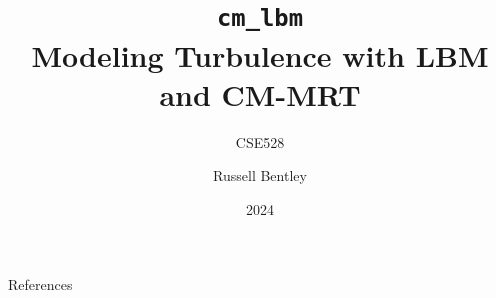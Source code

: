\documentclass{beamer}
\title{\lstinline{cm_lbm} \\ Modeling Turbulence with LBM and CM-MRT}
\subtitle{CSE528}
\author{Russell Bentley}
\institute{Stony Brook}
\date{2024}
\begin{document}
\frame{\titlepage}













\begin{frame}[allowframebreaks]{References}
    \tiny
    \printbibliography
\end{frame}
\end{document}

